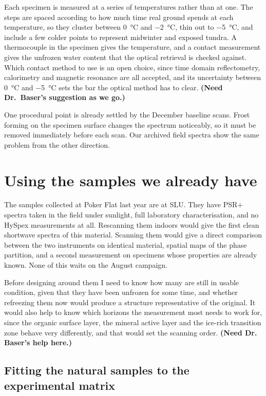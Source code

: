 \documentclass[11pt]{article}
\begin{document}
Each specimen is measured at a series of temperatures rather than at one. The
steps are spaced according to how much time real ground spends at each
temperature, so they cluster between \SI{0}{\degreeCelsius} and
\SI{-2}{\degreeCelsius}, thin out to \SI{-5}{\degreeCelsius}, and include a few
colder points to represent midwinter and exposed tundra. A thermocouple in the
specimen gives the temperature, and a contact measurement gives the unfrozen
water content that the optical retrieval is checked against. Which contact
method to use is an open choice, since time domain reflectometry, calorimetry
and magnetic resonance are all accepted, and its uncertainty between
\SI{0}{\degreeCelsius} and \SI{-5}{\degreeCelsius} sets the bar the optical
method has to clear. \textbf{(Need Dr.\ Baser's suggestion as we go.)}

One procedural point is already settled by the December baseline scans. Frost
forming on the specimen surface changes the spectrum noticeably, so it must be
removed immediately before each scan. Our archived field spectra show the same
problem from the other direction.

\section{Using the samples we already have}

The samples collected at Poker Flat last year are at SLU.
They have PSR+ spectra taken in the field under sunlight, full laboratory
characterisation, and no HySpex measurements at all. Rescanning them indoors
would give the first clean shortwave spectra of this material. Scanning them would give a direct comparison between
the two instruments on identical material, spatial maps of the phase partition,
and a second measurement on specimens whose properties are already known. None
of this waits on the August campaign.

Before designing around them I need to know how many are still in usable
condition, given that they have been unfrozen for some time, and whether
refreezing them now would produce a structure representative of the original.
It would also help to know which horizons the measurement most needs to work
for, since the organic surface layer, the mineral active layer and the ice-rich
transition zone behave very differently, and that would set the scanning order.
\textbf{(Need Dr. Baser's help here.)}

\subsection{Fitting the natural samples to the experimental matrix}
\end{document}
